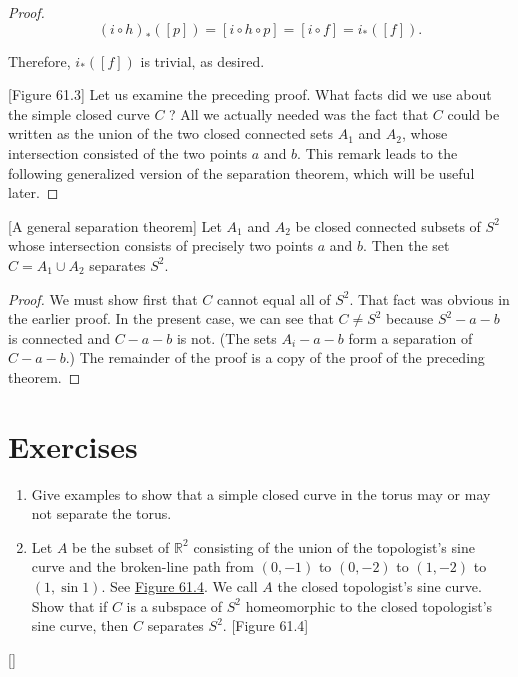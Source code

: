 \begin{proof}
\[
{( i \circ h) }_{ * }( [ p] ) = [ {i \circ h \circ p}] = [ {i \circ f}] = i_{ * }( [ f] ).
\]

Therefore, \(i_{ * }( [ f] )\) is trivial, as desired.

[Figure 61.3]
Let us examine the preceding proof. What facts did we use about the simple closed curve \(C\) ? All we actually needed was the fact that \(C\) could be written as the union of the two closed connected sets \(A_{1}\) and \(A_{2}\), whose intersection consisted of the two points \(a\) and \(b\). This remark leads to the following generalized version of the separation theorem, which will be useful later.
\end{proof}
\begin{theorem}
\label{thm:\thetheorem}[A general separation theorem]
Let \(A_{1}\) and \(A_{2}\) be closed connected subsets of \(S^{2}\) whose intersection consists of precisely two points \(a\) and \(b\). Then the set \(C = A_{1} \cup {A}_{2}\) separates \(S^{2}\).
\end{theorem}

\begin{proof}
We must show first that \(C\) cannot equal all of \(S^{2}\). That fact was obvious in the earlier proof. In the present case, we can see that \(C \neq {S}^{2}\) because \(S^{2} - a - b\) is connected and \(C - a - b\) is not. (The sets \(A_{i} - a - b\) form a separation of \(C - a - b\).)
The remainder of the proof is a copy of the proof of the preceding theorem.
\end{proof}
\section*{Exercises}
\begin{enumerate}[itemsep=0.4em, parsep=0pt, topsep=0pt, partopsep=0pt, leftmargin=*, label=\arabic*., ref=\arabic*]
\item Give examples to show that a simple closed curve in the torus may or may not separate the torus.
\item Let \(A\) be the subset of \(\mathbb{R}^{2}\) consisting of the union of the topologist's sine curve and the broken-line path from \(( {0, - 1})\) to \(( {0, - 2})\) to \(( {1, - 2})\) to \(( {1,\sin 1})\). See \hyperref[fig:61.4]{Figure 61.4}. We call \(A\) the closed topologist's sine curve. Show that if \(C\) is a subspace of \(S^{2}\) homeomorphic to the closed topologist's sine curve, then \(C\) separates \(S^{2}\). [Figure 61.4]
\end{enumerate}
[\protect\sectionDagger]

